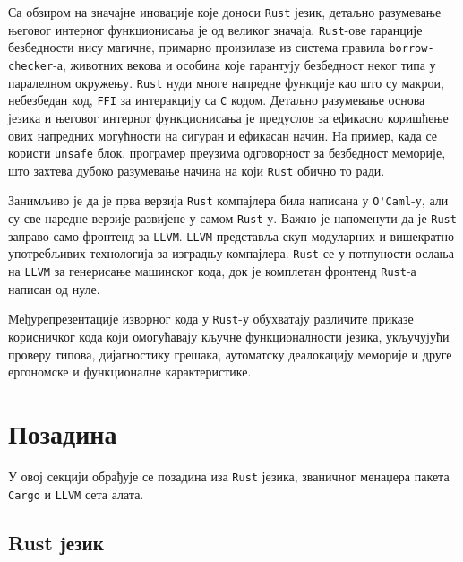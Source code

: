 Са обзиром на значајне иновације које доноси \verb|Rust| језик, детаљно разумевање његовог интерног функционисања је од великог значаја. \verb|Rust|-ове гаранције 
безбедности нису магичне, примарно произилазе из система правила \verb|borrow-checker|-а, животних векова и особина које гарантују безбедност неког типа 
у паралелном окружењу. \verb|Rust| нуди многе напредне функције као што су макрои, небезбедан код, \verb|FFI| за интеракцију са \verb|C| кодом. Детаљно разумевање основа језика и његовог интерног функционисања је предуслов за ефикасно коришћење ових напредних 
могућности на сигуран и ефикасан начин. На пример, када се користи \verb|unsafe| блок, програмер преузима одговорност за безбедност меморије, 
што захтева дубоко разумевање начина на који \verb|Rust| обично то ради.

Занимљиво је да је прва верзија \verb|Rust| компајлера била написана у \verb|O'Caml|-у, али су све наредне верзије развијене у самом \verb|Rust|-у. 
Важно је напоменути да је \verb|Rust| заправо само фронтенд за \verb|LLVM|. \verb|LLVM| представља скуп модуларних и вишекратно употребљивих технологија за изградњу компајлера. 
\verb|Rust| се у потпуности ослања на \verb|LLVM| за генерисање машинског кода, док је комплетан фронтенд \verb|Rust|-а написан од нуле.

Међурепрезентације изворног кода у \verb|Rust|-у обухватају различите приказе корисничког кода који омогућавају кључне функционалности језика, 
укључујући проверу типова, дијагностику грешака, аутоматску деалокацију меморије и друге ергономске и функционалне карактеристике.

\newpage

\section{Позадина}

У овој секцији обрађује се позадина иза \verb|Rust| језика, званичног менаџера пакета \verb|Cargo| и 
\verb|LLVM| сета алата.

\subsection{Rust језик}

